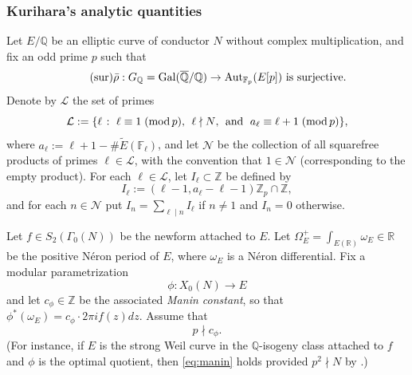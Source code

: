 \documentclass[10pt,reqno]{amsart}
\numberwithin{equation}{section}
\theoremstyle{plain}
\theoremstyle{definition}
\theoremstyle{definition}
\theoremstyle{plain}
\theoremstyle{plain}
\theoremstyle{plain}
\theoremstyle{plain}
\theoremstyle{plain}
\theoremstyle{plain}
\newcommand{\Z}{\mathbb{Z}}
\newcommand{\Q}{\mathbb{Q}}
\newcommand{\R}{\mathbb{R}}
\begin{document}
\subsubsection{Kurihara's analytic quantities}

Let $E/\Q$ be an elliptic curve of conductor $N$ without complex multiplication, and fix an odd prime $p$ such that
\begin{equation}\label{eq:irred}
\tag{sur}
\textrm{$\bar{\rho}: G_{\Q}=\operatorname{Gal}(\overline{\Q}/\Q)\to{\rm Aut}_{\mathbb{F}_p}(E[p])$ is surjective}.
\end{equation}
Denote by $\mathcal{L}$ the set of primes
\[
\mathcal{L}:=\{\ell\;\colon\;\textrm{$\ell\equiv 1\;({\rm mod}\,p)$,\; $\ell\nmid N$,\; and\; $a_\ell\equiv \ell+1\;({\rm mod}\,p)$}\},
\]
where $a_\ell:=\ell+1-\#\widetilde{E}(\mathbb{F}_\ell)$, and let $\mathcal{N}$ be the collection of all squarefree products of primes $\ell\in\mathcal{L}$, with the convention that $1\in\mathcal{N}$ (corresponding to the empty product). For each $\ell\in\mathcal{L}$, let $I_\ell\subset\Z$ be defined by
\[
I_\ell:=(\ell-1,a_\ell-\ell-1)\Z_p\cap\Z,
\]
and for each $n\in\mathcal{N}$ put $I_n=\sum_{\ell\mid n}I_\ell$ if $n\neq 1$ and $I_n=0$ otherwise.

Let $f\in S_2(\Gamma_0(N))$ be the newform attached to $E$. Let  $\Omega_E^+=\int_{E(\R)}\omega_E\in\R$ be the positive N\'eron period of $E$, where $\omega_E$ is a N\'{e}ron differential. Fix a modular parametrization
\[
\phi:X_0(N)\rightarrow E
\]
and let $c_\phi\in\Z$ be the associated \emph{Manin constant}, so that $\phi^*(\omega_E)=c_\phi\cdot 2\pi if(z)dz$. Assume that 
\begin{equation}\label{eq:manin}
p\nmid c_\phi. \tag{$p\nmid c_\phi$}
\end{equation}
(For instance, if $E$ is the strong Weil curve in the $\Q$-isogeny class attached to $f$ and $\phi$ is the optimal quotient, then \eqref{eq:manin} holds provided $p^2\nmid N$ by \cite[Cor.~4.1]{mazur}.) 
\end{document}

